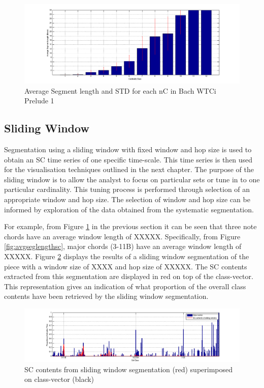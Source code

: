 \documentclass{article}
\begin{document}
\begin{figure}[htb]
\centering
\includegraphics[width=.9\linewidth]{../plots/avgseglengthcard.png}
\caption{\label{fig:avgseglengthcard}Average Segment length and STD for each nC in Bach WTCi Prelude 1}
\end{figure}
\subsection{Sliding Window}
\label{sec-8-2}

Segmentation using a sliding window with fixed window and hop size is
used to obtain an SC time series of one specific time-scale. This time
series is then used for the visualisation techniques outlined in the
next chapter. The purpose of the sliding window is to allow the
analyst to focus on particular sets or tune in to one particular
cardinality. This tuning process is performed through selection of an
appropriate window and hop size. The selection of window and hop size
can be informed by exploration of the data obtained from the
systematic segmentation.

For example, from Figure \ref{fig:avgseglengthcard} in the previous
section it can be seen that three note chords have an average window
length of XXXXX. Specifically, from Figure \ref{fig:avgseglengthsc},
major chords (3-11B) have an average window length of XXXXX. Figure
\ref{fig:cvplusswseg} displays the results of a sliding window
segmentation of the piece with a window size of XXXX and hop size of
XXXXX. The SC contents extracted from this segmentation are displayed
in red on top of the class-vector. This representation gives an
indication of what proportion of the overall class contents have been
retrieved by the sliding window segmentation.

\begin{figure}[htb]
\centering
\includegraphics[width=.9\linewidth]{../plots/classvecclasshist.png}
\caption{\label{fig:cvplusswseg}SC contents from sliding window segmentation (red) superimposed on class-vector (black)}
\end{figure}
\end{document}
